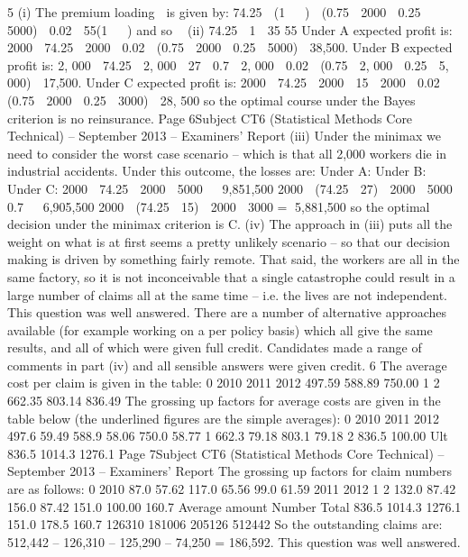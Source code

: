 5
(i)
The premium loading  is given by:
74.25  (1   )  (0.75  2000  0.25  5000)  0.02  55(1   )
and so

(ii)
74.25
 1  35%
55
Under A expected profit is:
2000  74.25  2000  0.02  (0.75  2000  0.25  5000)
 38,500.
Under B expected profit is:
2, 000  74.25  2, 000  27  0.7  2, 000  0.02  (0.75  2, 000  0.25  5, 000)
 17,500.
Under C expected profit is:
2000  74.25  2000  15  2000  0.02  (0.75  2000  0.25  3000)
 28, 500
so the optimal course under the Bayes criterion is no reinsurance.
Page 6Subject CT6 (Statistical Methods Core Technical) – September 2013 – Examiners’ Report
(iii)
Under the minimax we need to consider the worst case scenario – which is that
all 2,000 workers die in industrial accidents.
Under this outcome, the losses are:
Under A:
Under B:
Under C:
2000  74.25  2000  5000   9,851,500
2000  (74.25  27)  2000  5000  0.7   6,905,500
2000  (74.25  15)  2000  3000 = 5,881,500
so the optimal decision under the minimax criterion is C.
(iv)
The approach in (iii) puts all the weight on what is at first seems a pretty
unlikely scenario – so that our decision making is driven by something fairly
remote.
That said, the workers are all in the same factory, so it is not inconceivable
that a single catastrophe could result in a large number of claims all at the
same time – i.e. the lives are not independent.
This question was well answered. There are a number of alternative approaches available
(for example working on a per policy basis) which all give the same results, and all of which
were given full credit. Candidates made a range of comments in part (iv) and all sensible
answers were given credit.
6
The average cost per claim is given in the table:
0
2010
2011
2012
497.59
588.89
750.00
1 2
662.35
803.14 836.49
The grossing up factors for average costs are given in the table below (the underlined
figures are the simple averages):
0
2010
2011
2012
497.6
59.49%
588.9
58.06%
750.0
58.77%
1
662.3
79.18%
803.1
79.18%
2
836.5
100.00%
Ult
836.5
1014.3
1276.1
Page 7Subject CT6 (Statistical Methods Core Technical) – September 2013 – Examiners’ Report
The grossing up factors for claim numbers are as follows:
0
2010
87.0
57.62%
117.0
65.56%
99.0
61.59%
2011
2012
1
2
132.0
87.42%
156.0
87.42%
151.0
100.00%
160.7
Average
amount Number Total
836.5
1014.3
1276.1 151.0
178.5
160.7 126310
181006
205126
512442
So the outstanding claims are:
512,442 – 126,310 – 125,290 – 74,250 = 186,592.
This question was well answered.
